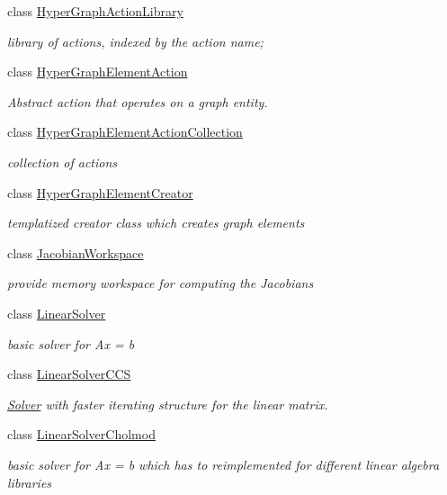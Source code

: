 \begin{DoxyCompactItemize}
class \hyperlink{classg2o_1_1HyperGraphActionLibrary}{Hyper\+Graph\+Action\+Library}
\begin{DoxyCompactList}\small\item\em library of actions, indexed by the action name; \end{DoxyCompactList}\item 
class \hyperlink{classg2o_1_1HyperGraphElementAction}{Hyper\+Graph\+Element\+Action}
\begin{DoxyCompactList}\small\item\em Abstract action that operates on a graph entity. \end{DoxyCompactList}\item 
class \hyperlink{classg2o_1_1HyperGraphElementActionCollection}{Hyper\+Graph\+Element\+Action\+Collection}
\begin{DoxyCompactList}\small\item\em collection of actions \end{DoxyCompactList}\item 
class \hyperlink{classg2o_1_1HyperGraphElementCreator}{Hyper\+Graph\+Element\+Creator}
\begin{DoxyCompactList}\small\item\em templatized creator class which creates graph elements \end{DoxyCompactList}\item 
class \hyperlink{classg2o_1_1JacobianWorkspace}{Jacobian\+Workspace}
\begin{DoxyCompactList}\small\item\em provide memory workspace for computing the Jacobians \end{DoxyCompactList}\item 
class \hyperlink{classg2o_1_1LinearSolver}{Linear\+Solver}
\begin{DoxyCompactList}\small\item\em basic solver for Ax = b \end{DoxyCompactList}\item 
class \hyperlink{classg2o_1_1LinearSolverCCS}{Linear\+Solver\+C\+CS}
\begin{DoxyCompactList}\small\item\em \hyperlink{classg2o_1_1Solver}{Solver} with faster iterating structure for the linear matrix. \end{DoxyCompactList}\item 
class \hyperlink{classg2o_1_1LinearSolverCholmod}{Linear\+Solver\+Cholmod}
\begin{DoxyCompactList}\small\item\em basic solver for Ax = b which has to reimplemented for different linear algebra libraries \end{DoxyCompactList}\item 

\end{DoxyCompactItemize}
